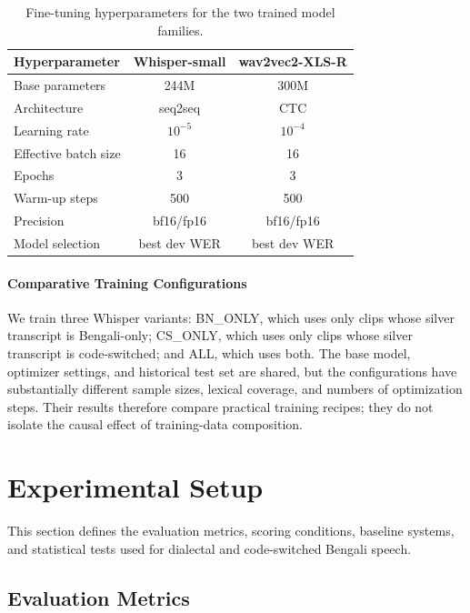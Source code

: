 \documentclass[journal]{IEEEtran}
\begin{document}
\begin{table}[t]
\caption{Fine-tuning hyperparameters for the two trained model families.}
\label{tab:hparams}
\centering\small
\begin{tabular}{lcc}
\toprule
\textbf{Hyperparameter} & \textbf{Whisper-small} & \textbf{wav2vec2-XLS-R} \\
\midrule
Base parameters & 244M & 300M \\
Architecture & seq2seq & CTC \\
Learning rate & $10^{-5}$ & $10^{-4}$ \\
Effective batch size & 16 & 16 \\
Epochs & 3 & 3 \\
Warm-up steps & 500 & 500 \\
Precision & bf16/fp16 & bf16/fp16 \\
Model selection & best dev WER & best dev WER \\
\bottomrule
\end{tabular}
\end{table}

\paragraph*{Comparative Training Configurations}

We train three Whisper variants: BN\_ONLY, which uses only clips whose silver transcript is Bengali-only; CS\_ONLY, which uses only clips whose silver transcript is code-switched; and ALL, which uses both. The base model, optimizer settings, and historical test set are shared, but the configurations have substantially different sample sizes, lexical coverage, and numbers of optimization steps. Their results therefore compare practical training recipes; they do not isolate the causal effect of training-data composition.


\section{Experimental Setup}
\label{sec:setup}

This section defines the evaluation metrics, scoring conditions, baseline
systems, and statistical tests used for dialectal and code-switched Bengali
speech.


\subsection{Evaluation Metrics}
\end{document}
